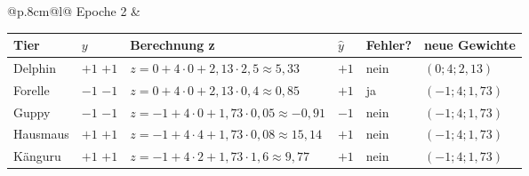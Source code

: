 \noindent\begin{tabular}{@{}p{.8cm}@{}l@{}}
\hspace{-0.5cm}\tiny{Epoche 2} &
\begin{tabular}{|>{\centering\arraybackslash}p{1.7cm}|>{\centering\arraybackslash}p{0.8cm}|p{6cm}|>{\centering\arraybackslash}p{0.8cm}|>{\centering\arraybackslash}p{1.2cm}|>{\centering\arraybackslash}p{2.4cm}|}
\hline
Tier & $y$ & Berechnung z & $\hat y$ & \small{Fehler?} & \small{neue Gewichte} \\
\hline
Delphin & \ifdefined\zeigloesungen \textcolor{loesgruen}{$+1$} \else $+1$ \fi & \ifdefined\zeigloesungen \textcolor{loesgruen}{$z = 0 + 4\cdot0 + 2{,}13\cdot2{,}5 \approx 5{,}33$} \fi & \ifdefined\zeigloesungen \textcolor{loesgruen}{$+1$} \fi & \ifdefined\zeigloesungen \textcolor{loesgruen}{nein} \fi & \ifdefined\zeigloesungen \textcolor{loesgruen}{$(0;4;2{,}13)$} \fi \\[8pt]
\hline
Forelle & \ifdefined\zeigloesungen \textcolor{loesgruen}{$-1$} \else $-1$ \fi & \ifdefined\zeigloesungen \textcolor{loesgruen}{$z = 0 + 4\cdot0 + 2{,}13\cdot0{,}4 \approx 0{,}85$} \fi & \ifdefined\zeigloesungen \textcolor{loesgruen}{$+1$} \fi & \ifdefined\zeigloesungen \textcolor{loesgruen}{ja} \fi & \ifdefined\zeigloesungen \textcolor{loesgruen}{$(-1;4;1{,}73)$} \fi \\[8pt]
\hline
Guppy & \ifdefined\zeigloesungen \textcolor{loesgruen}{$-1$} \else $-1$ \fi & \ifdefined\zeigloesungen \textcolor{loesgruen}{$z = {-1} + 4\cdot0 + 1{,}73\cdot0{,}05 \approx {-0{,}91}$} \fi & \ifdefined\zeigloesungen \textcolor{loesgruen}{$-1$} \fi & \ifdefined\zeigloesungen \textcolor{loesgruen}{nein} \fi & \ifdefined\zeigloesungen \textcolor{loesgruen}{$(-1;4;1{,}73)$} \fi \\[8pt]
\hline
Hausmaus & \ifdefined\zeigloesungen \textcolor{loesgruen}{$+1$} \else $+1$ \fi & \ifdefined\zeigloesungen \textcolor{loesgruen}{$z = {-1} + 4\cdot4 + 1{,}73\cdot0{,}08 \approx 15{,}14$} \fi & \ifdefined\zeigloesungen \textcolor{loesgruen}{$+1$} \fi & \ifdefined\zeigloesungen \textcolor{loesgruen}{nein} \fi & \ifdefined\zeigloesungen \textcolor{loesgruen}{$(-1;4;1{,}73)$} \fi \\[8pt]
\hline
Känguru & \ifdefined\zeigloesungen \textcolor{loesgruen}{$+1$} \else $+1$ \fi & \ifdefined\zeigloesungen \textcolor{loesgruen}{$z = {-1} + 4\cdot2 + 1{,}73\cdot1{,}6 \approx 9{,}77$} \fi & \ifdefined\zeigloesungen \textcolor{loesgruen}{$+1$} \fi & \ifdefined\zeigloesungen \textcolor{loesgruen}{nein} \fi & \ifdefined\zeigloesungen \textcolor{loesgruen}{$(-1;4;1{,}73)$} \fi \\[8pt]
\hline
\end{tabular}
\end{tabular}
\medskip


